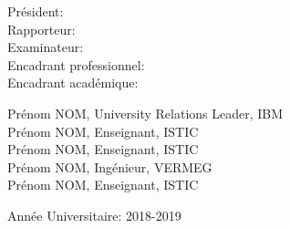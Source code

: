 \begin{titlepage}
\begin{flushleft}
\begin{minipage}[c]{0.3\columnwidth}
Président:\\
Rapporteur:\\
Examinateur:\\
Encadrant professionnel:\\
Encadrant académique:
\end{minipage}
\begin{minipage}[c]{0.6\columnwidth}
Prénom NOM, University Relations Leader, IBM\\
Prénom NOM, Enseignant, ISTIC\\
Prénom NOM, Enseignant, ISTIC\\
Prénom NOM, Ingénieur, VERMEG\\
Prénom NOM, Enseignant, ISTIC
\end{minipage}
 \end{flushleft}

\vskip2cm

{\large Année Universitaire: 2018-2019}\\[3cm] 



\vfill %

\end{titlepage}
%